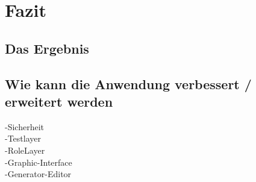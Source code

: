 \chapter{Fazit}




\section{Das Ergebnis}




\section{Wie kann die Anwendung verbessert / erweitert werden}

-Sicherheit \\
-Testlayer \\
-RoleLayer \\
-Graphic-Interface \\
-Generator-Editor \\

